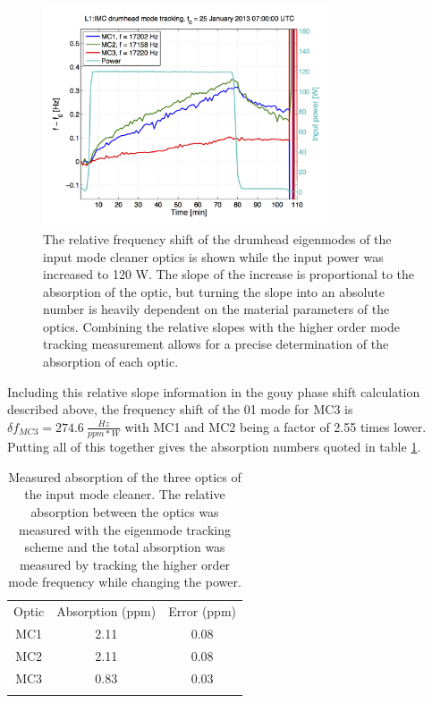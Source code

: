 \begin{figure}
	\centering
	\includegraphics[width = 0.75\textwidth]{Mode_Tracking.png}
	\caption{The relative frequency shift of the drumhead eigenmodes of the input 
		mode cleaner optics is shown while the input power was increased to 120 W.  
		The slope of the increase is proportional to the absorption of the optic, 
		but turning the slope into an absolute number is heavily dependent on the 
		material parameters of the optics.  
		Combining the relative slopes with the higher order mode tracking measurement 
		allows for a precise determination of the absorption of each optic.}
	\label{fig:ModeTracking}
\end{figure}	

Including this relative slope information in the gouy phase shift calculation described 
above, the frequency shift of the 01 mode for MC3 is $\delta f_{MC3}=274.6\ \tfrac{Hz}{ppm*W}$ 
with MC1 and MC2 being a factor of 2.55 times lower.  
Putting all of this together gives the absorption numbers quoted in table \ref{tab:Absorption}.

\begin{table}
	\centering
	\begin{tabular}{|c||c|c|}
		\hhline{|--|-|}
		Optic & Absorption (ppm) & Error (ppm)\\
		\hhline{|=#=|=|}
		MC1 & 2.11 & 0.08 \\
		\hhline{|--|-|}
		MC2 & 2.11 & 0.08 \\
		\hhline{|--|-|}
		MC3 & 0.83 & 0.03 \\
		\hhline{|--|-|}
	\end{tabular}
	\caption{Measured absorption of the three optics of the input mode cleaner.  
		The relative absorption between the optics was measured with the eigenmode tracking 
		scheme and the total absorption was measured by tracking the higher order mode 
		frequency while changing the power.}
	\label{tab:Absorption}	
\end{table}	



